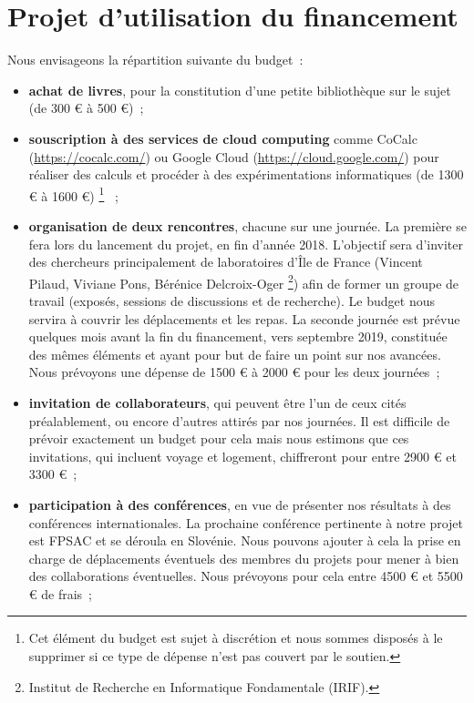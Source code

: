 \documentclass[a4paper, 10pt]{article}
\numberwithin{equation}{subsection}
\begin{document}
\vspace{-1cm}

\section*{\center Projet d'utilisation du financement}
Nous envisageons la répartition suivante du budget~:
\begin{itemize}
    \item {\bf achat de livres}, pour la constitution d'une petite
    bibliothèque sur le sujet (de 300 € à 500 €)~;
    \smallbreak

    \item {\bf souscription à des services de cloud computing} comme
    {\sc CoCalc} (\url{https://cocalc.com/}) ou {\sc Google Cloud}
    (\url{https://cloud.google.com/}) pour réaliser des calculs
    et procéder à des expérimentations informatiques (de 1300 € à 1600 €)%
    \footnote{Cet élément du budget est sujet à discrétion et nous
    sommes disposés à le supprimer si ce type de dépense n'est pas
    couvert par le soutien.}%
    ~;
    \smallbreak

    \item {\bf organisation de deux rencontres}, chacune sur une
    journée. La
    première se fera lors du lancement du projet, en fin d'année 2018.
    L'objectif sera d'inviter des chercheurs principalement de
    laboratoires d'Île de France (Vincent Pilaud, Viviane Pons,
    Bérénice Delcroix-Oger%
    \footnote{Institut de Recherche en Informatique Fondamentale
    (IRIF).})
    afin de former un groupe de travail
    (exposés, sessions de discussions et de recherche). Le budget
    nous servira à couvrir les déplacements et les repas. La
    seconde journée est prévue quelques mois avant la fin du
    financement, vers septembre 2019, constituée des mêmes éléments et
    ayant pour but de faire un point sur nos avancées. Nous
    prévoyons une dépense de 1500 € à 2000 € pour les deux journées~;
    \smallbreak

    \item {\bf invitation de collaborateurs}, qui peuvent être l'un de
    ceux cités préalablement, ou encore d'autres attirés par nos
    journées. Il est difficile de prévoir exactement un budget pour cela
    mais nous estimons que ces invitations, qui incluent voyage et
    logement, chiffreront pour entre 2900 € et 3300 €~;
    \smallbreak

    \item {\bf participation à des conférences}, en vue de présenter
    nos résultats à des conférences internationales. La prochaine
    conférence pertinente à notre projet est FPSAC
     et se déroula en Slovénie.
    Nous pouvons ajouter à cela la prise en charge de déplacements
    éventuels des membres du projets pour mener à bien des collaborations
    éventuelles.
    Nous prévoyons pour cela entre 4500 € et 5500 € de frais~;
\end{itemize}
\smallbreak
\end{document}
